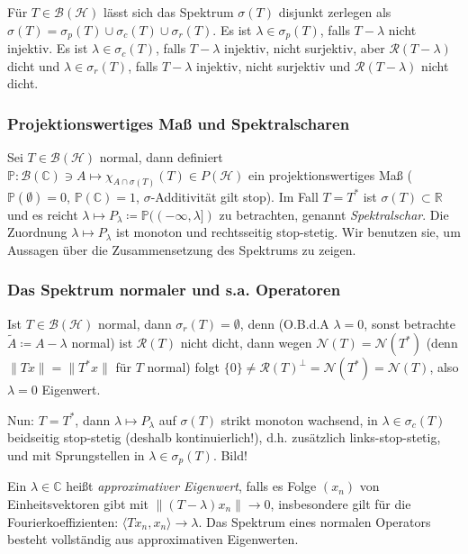 \documentclass[11pt,a4paper]{scrartcl}
\newcommand{\R}{\mathbb{R}} %
\newcommand{\C}{\mathbb{C}} %
\newcommand{\Hc}{\mathcal{H}}
\newcommand{\B}{\mathcal{B}}
\newcommand{\Nc}{\mathcal{N}}
\newcommand{\Rc}{\mathcal{R}}
\theoremstyle{plain}
\theoremstyle{definition}
\theoremstyle{remark}
\begin{document}
Für $T\in \B(\Hc)$ lässt sich das Spektrum $\sigma(T)$ disjunkt zerlegen als $\sigma(T)=\sigma_p(T) \cup \sigma_c(T) \cup \sigma_r(T)$. Es ist $\lambda \in \sigma_p(T)$, falls $T-\lambda$ nicht injektiv. Es ist $\lambda \in \sigma_c(T)$, falls $T-\lambda$ injektiv, nicht surjektiv, aber $\Rc(T-\lambda)$ dicht und $\lambda \in \sigma_r(T)$, falls $T-\lambda$ injektiv, nicht surjektiv und $\Rc(T-\lambda)$ nicht dicht.

\subsubsection{Projektionswertiges Maß und Spektralscharen}

Sei $T\in \B(\Hc)$ normal, dann definiert $\mathbb{P}: \B(\C) \ni A \mapsto \chi_{A\cap \sigma(T)}(T) \in P(\Hc)$ ein projektionswertiges Maß ($\mathbb{P}(\emptyset) = 0$, $\mathbb{P}(\C) = 1$, $\sigma$-Additivität gilt stop). Im Fall $T=T^*$ ist $\sigma(T)\subset \R$ und es reicht $\lambda \mapsto P_\lambda \coloneqq \mathbb{P}((-\infty, \lambda])$ zu betrachten, genannt \emph{Spektralschar}. Die Zuordnung $\lambda \mapsto P_\lambda$ ist monoton und rechtsseitig stop-stetig. Wir benutzen sie, um Aussagen über die Zusammensetzung des Spektrums zu zeigen.

\subsubsection{Das Spektrum normaler und s.a. Operatoren}

Ist $T\in \B(\Hc)$ normal, dann $\sigma_r(T)=\emptyset$, denn (O.B.d.A $\lambda=0$, sonst betrachte $\tilde A \coloneqq A-\lambda$ normal) ist $\Rc(T)$ nicht dicht, dann wegen $\Nc(T)=\Nc(T^*)$ (denn $\|Tx\|=\|T^*x\|$ für $T$ normal) folgt $\{0\} \neq \Rc(T)^\bot = \Nc(T^*) = \Nc(T)$, also $\lambda=0$ Eigenwert.

Nun: $T=T^*$, dann $\lambda \mapsto P_\lambda$ auf $\sigma(T)$ strikt monoton wachsend, in $\lambda \in \sigma_c(T)$ beidseitig stop-stetig (deshalb kontinuierlich!), d.h. zusätzlich links-stop-stetig,  und mit Sprungstellen in $\lambda \in \sigma_p(T)$. Bild!

Ein $\lambda\in \C$ heißt \emph{approximativer Eigenwert}, falls es Folge $(x_n)$ von Einheitsvektoren gibt mit $\|(T-\lambda)x_n\| \to 0$, insbesondere gilt für die Fourierkoeffizienten: $\langle Tx_n, x_n \rangle \to \lambda$. Das Spektrum eines normalen Operators besteht vollständig aus approximativen Eigenwerten.
\end{document}

